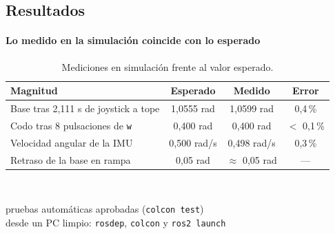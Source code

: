 \subsection{Resultados}
\begin{frame}{\insertsectionhead}
  \framesubtitle{Lo medido en la simulación coincide con lo esperado}
  \begin{table}
    \centering
    \caption{Mediciones en simulación frente al valor esperado.}
    \scriptsize
    \begin{tabular}{@{} l c c c @{}}
      \toprule
      \textbf{Magnitud} & \textbf{Esperado} & \textbf{Medido} & \textbf{Error} \\
      \midrule
      Base tras 2,111 s de joystick a tope & 1,0555 rad & 1,0599 rad & 0,4\,\% \\
      Codo tras 8 pulsaciones de \texttt{w} & 0,400 rad & 0,400 rad & $<$ 0,1\,\% \\
      Velocidad angular de la IMU & 0,500 rad/s & 0,498 rad/s & 0,3\,\% \\
      Retraso de la base en rampa & 0,05 rad & $\approx$ 0,05 rad & --- \\
      \bottomrule
    \end{tabular}
  \end{table}
  \vfill
  \begin{columns}[t, onlytextwidth]
    \\{\scriptsize pruebas automáticas aprobadas (\texttt{colcon test})}
    \\{\scriptsize desde un PC limpio: \texttt{rosdep}, \texttt{colcon} y \texttt{ros2 launch}}
  \end{columns}
\end{frame}

